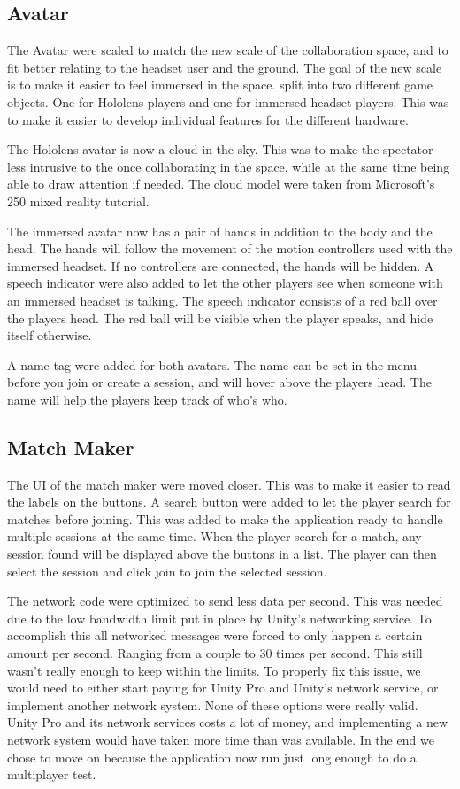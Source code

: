         \subsection{Avatar}
        The Avatar were scaled to match the new scale of the collaboration space, and to fit better relating to the headset user and the ground. The goal of the new scale is to make it easier to feel immersed in the space. split into two different game objects. One for Hololens players and one for immersed headset players. This was to make it easier to develop individual features for the different hardware.
        
        The Hololens avatar is now a cloud in the sky. This was to make the spectator less intrusive to the once collaborating in the space, while at the same time being able to draw attention if needed. The cloud model were taken from Microsoft's 250 mixed reality tutorial.
        
        The immersed avatar now has a pair of hands in addition to the body and the head. The hands will follow the movement of the motion controllers used with the immersed headset. If no controllers are connected, the hands will be hidden. A speech indicator were also added to let the other players see when someone with an immersed headset is talking. The speech indicator consists of a red ball over the players head. The red ball will be visible when the player speaks, and hide itself otherwise.
        
        A name tag were added for both avatars. The name can be set in the menu before you join or create a session, and will hover above the players head. The name will help the players keep track of who's who. %
    
        \subsection{Match Maker}
        The UI of the match maker were moved closer. This was to make it easier to read the labels on the buttons. A search button were added to let the player search for matches before joining. This was added to make the application ready to handle multiple sessions at the same time. When the player search for a match, any session found will be displayed above the buttons in a list. The player can then select the session and click join to join the selected session.
        
        The network code were optimized to send less data per second. This was needed due to the low bandwidth limit put in place by Unity's networking service. To accomplish this all networked messages were forced to only happen a certain amount per second. Ranging from a couple to 30 times per second. This still wasn't really enough to keep within the limits. To properly fix this issue, we would need to either start paying for Unity Pro and Unity's network service, or implement another network system. None of these options were really valid. Unity Pro and its network services costs a lot of money, and implementing a new network system would have taken more time than was available. In the end we chose to move on because the application now run just long enough to do a multiplayer test.
        
